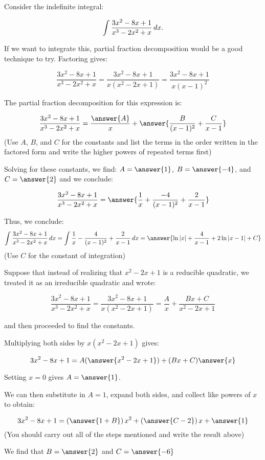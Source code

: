 \documentclass{ximera}
\author{Jim Talamo}
\begin{document}
\begin{exercise}
Consider the indefinite integral: 

\[
\int \frac{3x^2-8x+1}{x^3-2x^2+x} \mathop{}\!d x.
\]

If we want to integrate this, partial fraction decomposition would be a good technique to try.  Factoring gives:

\[
\frac{3x^2-8x+1}{x^3-2x^2+x}  =\frac{3x^2-8x+1}{x(x^2-2x+1)} =\frac{3x^2-8x+1}{x(x-1)^2} 
\]  

The partial fraction decomposition for this expression is:

\[
\frac{3x^2-8x+1}{x^3-2x^2+x}= \frac{\answer{A}}{x}+\answer{\frac{B}{(x-1)^2}+\frac{C}{x-1}}
\]
(Use $A$, $B$, and $C$ for the constants and list the terms in the order written in the factored form and write the higher powers of repeated terms first)

Solving for these constants, we find: $A = \answer{1}$, $B=\answer{-4}$, and $C=\answer{2}$ and we conclude:

\[
\frac{3x^2-8x+1}{x^3-2x^2+x}= \answer{\frac{1}{x}+\frac{-4}{(x-1)^2}+\frac{2}{x-1}}
\]

Thus, we conclude:
\[
\int \frac{3x^2-8x+1}{x^3-2x^2+x} \d x = \int \frac{1}{x}-\frac{4}{(x-1)^2}+\frac{2}{x-1} \d x = \answer{\ln|x|+\frac{4}{x-1}+2\ln|x-1| +C}
\]
(Use $C$ for the constant of integration)


\begin{exercise}
Suppose that instead of realizing that $x^2-2x+1$ is a reducible quadratic, we treated it as an irreducible quadratic and wrote:


\[
\frac{3x^2-8x+1}{x^3-2x^2+x}  =\frac{3x^2-8x+1}{x(x^2-2x+1)} =\frac{A}{x}+\frac{Bx+C}{x^2-2x+1} 
\]  

and then proceeded to find the constants.

Multiplying both sides by $x(x^2-2x+1)$ gives:

\[
3x^2-8x+1 = A(\answer{x^2-2x+1})+(Bx+C)\answer{x}
\]  

\begin{exercise}
Setting $x=0$ gives $A=\answer{1}$.

We can then substitute in $A=1$, expand both sides, and collect like powers of $x$ to obtain:

\[
3x^2-8x+1 = \left(\answer{1+B}\right)x^2+\left(\answer{C-2}\right)x+\answer{1}
\]
(You should carry out all of the steps mentioned and write the result above)

We find that $B=\answer{2}$ and $C=\answer{-6}$


\end{exercise}
\end{exercise}
\end{exercise}
\end{document}
